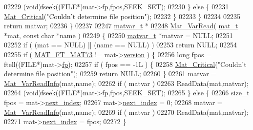 \begin{DoxyCode}
{{{{{{{{{{{{{{{{{{{{{{{{{{{{{{{{{{{{{{{{{{{02229             (void)fseek((FILE*)mat->\hyperlink{struct__mat__t_a85f562e407ca9ad4d2a6e14f839432b7}{fp},fpos,SEEK\_SET);
02230         \} \textcolor{keywordflow}{else} \{
02231             \hyperlink{group__mat__util_gaf51f2bfbb5580f575e4dd79757e2b80c}{Mat\_Critical}(\textcolor{stringliteral}{"Couldn't determine file position"});
02232         \}
02233     \}
02234 
02235     \textcolor{keywordflow}{return} matvar;
02236 \}
02237 
02247 \hyperlink{group___m_a_t_structmatvar__t}{matvar\_t} *
\hyperlink{group___m_a_t_ga3505f63029763eaa73d5a19f1115eb42}{02248} \hyperlink{group___m_a_t_ga3505f63029763eaa73d5a19f1115eb42}{Mat\_VarRead}( \hyperlink{struct__mat__t}{mat\_t} *mat, \textcolor{keyword}{const} \textcolor{keywordtype}{char} *name )
02249 \{
02250     \hyperlink{group___m_a_t_structmatvar__t}{matvar\_t} *matvar = NULL;
02251 
02252     \textcolor{keywordflow}{if} ( (mat == NULL) || (name == NULL) )
02253         \textcolor{keywordflow}{return} NULL;
02254 
02255     \textcolor{keywordflow}{if} ( \hyperlink{group___m_a_t_ggad03442b8378999189d510e3745c702b7a765c5d1d5038947646260dc82483517e}{MAT\_FT\_MAT73} != mat->\hyperlink{struct__mat__t_a729c2bc0afc97485057a5af425635b1a}{version} ) \{
02256         \textcolor{keywordtype}{long} fpos = ftell((FILE*)mat->\hyperlink{struct__mat__t_a85f562e407ca9ad4d2a6e14f839432b7}{fp});
02257         \textcolor{keywordflow}{if} ( fpos == -1L ) \{
02258             \hyperlink{group__mat__util_gaf51f2bfbb5580f575e4dd79757e2b80c}{Mat\_Critical}(\textcolor{stringliteral}{"Couldn't determine file position"});
02259             \textcolor{keywordflow}{return} NULL;
02260         \}
02261         matvar = \hyperlink{group___m_a_t_ga46da2e45ed96d3f1a6ec643757f2b086}{Mat\_VarReadInfo}(mat,name);
02262         \textcolor{keywordflow}{if} ( matvar )
02263             ReadData(mat,matvar);
02264         (void)fseek((FILE*)mat->\hyperlink{struct__mat__t_a85f562e407ca9ad4d2a6e14f839432b7}{fp},fpos,SEEK\_SET);
02265     \} \textcolor{keywordflow}{else} \{
02266         \textcolor{keywordtype}{size\_t} fpos = mat->\hyperlink{struct__mat__t_a0163a12f9735356723bb604992639d9e}{next\_index};
02267         mat->\hyperlink{struct__mat__t_a0163a12f9735356723bb604992639d9e}{next\_index} = 0;
02268         matvar = \hyperlink{group___m_a_t_ga46da2e45ed96d3f1a6ec643757f2b086}{Mat\_VarReadInfo}(mat,name);
02269         \textcolor{keywordflow}{if} ( matvar )
02270             ReadData(mat,matvar);
02271         mat->\hyperlink{struct__mat__t_a0163a12f9735356723bb604992639d9e}{next\_index} = fpos;
02272     \}
}}}}}}}}}}}}}}}}}}}}}}}}}}}}}}}}}}}}}}}}}}}
\end{DoxyCode}
